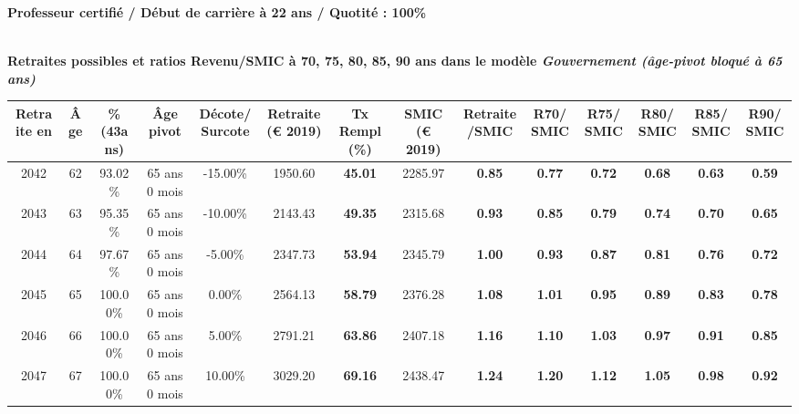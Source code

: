{\bf \noindent Professeur certifié / Début de carrière à 22 ans / Quotité : 100\%}  ~ 

 ~\\{\bf \noindent Retraites possibles et ratios Revenu/SMIC à 70, 75, 80, 85, 90 ans dans le modèle \emph{Gouvernement (âge-pivot bloqué à 65 ans)}}  
 
\begin{adjustbox}{max width=\textwidth} 
\begin{tabular}[htb]{|c|c||c|c|c||c|c||c|c||c|c|c|c|c|} 
\hline 
 Retraite en &  Âge &  \%(43ans) &  Âge pivot &  Décote/Surcote &  Retraite (\euro{} 2019) &  Tx Rempl(\%) &  SMIC (\euro{} 2019) &  Retraite/SMIC &  R70/SMIC &  R75/SMIC &  R80/SMIC &  R85/SMIC &  R90/SMIC \\ 
\hline \hline 
 2042 &  62 &  93.02\% &  65 ans 0 mois &  -15.00\% &  1950.60 &  {\bf 45.01} &  2285.97 &  {\bf {\color{red} 0.85}} &  {\bf {\color{red} 0.77}} &  {\bf {\color{red} 0.72}} &  {\bf {\color{red} 0.68}} &  {\bf {\color{red} 0.63}} &  {\bf {\color{red} 0.59}} \\ 
\hline 
 2043 &  63 &  95.35\% &  65 ans 0 mois &  -10.00\% &  2143.43 &  {\bf 49.35} &  2315.68 &  {\bf {\color{red} 0.93}} &  {\bf {\color{red} 0.85}} &  {\bf {\color{red} 0.79}} &  {\bf {\color{red} 0.74}} &  {\bf {\color{red} 0.70}} &  {\bf {\color{red} 0.65}} \\ 
\hline 
 2044 &  64 &  97.67\% &  65 ans 0 mois &  -5.00\% &  2347.73 &  {\bf 53.94} &  2345.79 &  {\bf 1.00} &  {\bf {\color{red} 0.93}} &  {\bf {\color{red} 0.87}} &  {\bf {\color{red} 0.81}} &  {\bf {\color{red} 0.76}} &  {\bf {\color{red} 0.72}} \\ 
\hline 
 2045 &  65 &  100.00\% &  65 ans 0 mois &  0.00\% &  2564.13 &  {\bf 58.79} &  2376.28 &  {\bf 1.08} &  {\bf 1.01} &  {\bf {\color{red} 0.95}} &  {\bf {\color{red} 0.89}} &  {\bf {\color{red} 0.83}} &  {\bf {\color{red} 0.78}} \\ 
\hline 
 2046 &  66 &  100.00\% &  65 ans 0 mois &  5.00\% &  2791.21 &  {\bf 63.86} &  2407.18 &  {\bf 1.16} &  {\bf 1.10} &  {\bf 1.03} &  {\bf {\color{red} 0.97}} &  {\bf {\color{red} 0.91}} &  {\bf {\color{red} 0.85}} \\ 
\hline 
 2047 &  67 &  100.00\% &  65 ans 0 mois &  10.00\% &  3029.20 &  {\bf 69.16} &  2438.47 &  {\bf 1.24} &  {\bf 1.20} &  {\bf 1.12} &  {\bf 1.05} &  {\bf {\color{red} 0.98}} &  {\bf {\color{red} 0.92}} \\ 
\hline 
\hline 
\end{tabular} 
\end{adjustbox} 
 
